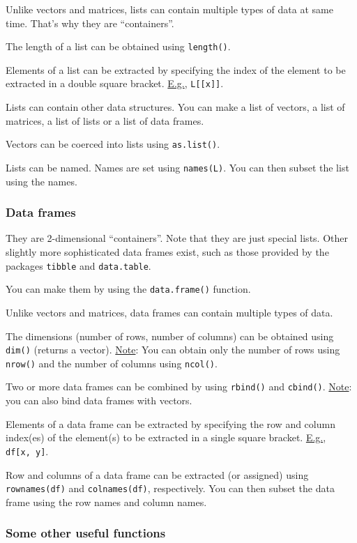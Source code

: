 \documentclass[
]{article}
\begin{document}
Unlike vectors and matrices, lists can contain multiple types of data at
same time. That's why they are ``containers''.

The length of a list can be obtained using \texttt{length()}.

Elements of a list can be extracted by specifying the index of the
element to be extracted in a double square bracket. \underline{E.g.},
\texttt{L{[}{[}x{]}{]}}.

Lists can contain other data structures. You can make a list of vectors,
a list of matrices, a list of lists or a list of data frames.

Vectors can be coerced into lists using \texttt{as.list()}.

Lists can be named. Names are set using \texttt{names(L)}. You can then
subset the list using the names.

\hypertarget{data-frames}{%
\subsubsection{Data frames}\label{data-frames}}

They are 2-dimensional ``containers''. Note that they are just special
lists. Other slightly more sophisticated data frames exist, such as
those provided by the packages \texttt{tibble} and \texttt{data.table}.

You can make them by using the \texttt{data.frame()} function.

Unlike vectors and matrices, data frames can contain multiple types of
data.

The dimensions (number of rows, number of columns) can be obtained using
\texttt{dim()} (returns a vector). \underline{Note}: You can obtain only
the number of rows using \texttt{nrow()} and the number of columns using
\texttt{ncol()}.

Two or more data frames can be combined by using \texttt{rbind()} and
\texttt{cbind()}. \underline{Note}: you can also bind data frames with
vectors.

Elements of a data frame can be extracted by specifying the row and
column index(es) of the element(s) to be extracted in a single square
bracket. \underline{E.g.}, \texttt{df{[}x,\ y{]}}.

Row and columns of a data frame can be extracted (or assigned) using
\texttt{rownames(df)} and \texttt{colnames(df)}, respectively. You can
then subset the data frame using the row names and column names.

\hypertarget{some-other-useful-functions}{%
\subsubsection{Some other useful
functions}\label{some-other-useful-functions}}
\end{document}
